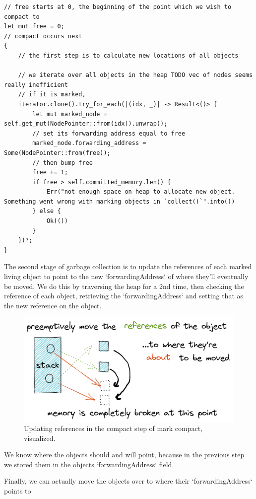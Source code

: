\documentclass[index]{subfiles}
\begin{document}
\begin{verbatim}
// free starts at 0, the beginning of the point which we wish to compact to
let mut free = 0;
// compact occurs next
{
    // the first step is to calculate new locations of all objects

    // we iterate over all objects in the heap TODO vec of nodes seems really inefficient
    // if it is marked,
    iterator.clone().try_for_each(|(idx, _)| -> Result<()> {
        let mut marked_node = self.get_mut(NodePointer::from(idx)).unwrap();
        // set its forwarding address equal to free
        marked_node.forwarding_address = Some(NodePointer::from(free));
        // then bump free
        free += 1;
        if free > self.committed_memory.len() {
            Err("not enough space on heap to allocate new object. Something went wrong with marking objects in `collect()`".into())
        } else {
            Ok(())
        }
    })?;
}
\end{verbatim}

The second stage of garbage collection is to update the references of each marked living object to point to the new `forwardingAddress` of where they'll eventually be moved. We do this by traversing the heap for a 2nd time, then checking the reference of each object, retrieving the `forwardingAddress` and setting that as the new reference on the object.

\begin{figure}[H]
    \centering
    \includegraphics[scale=0.3]{pics/update-references.png}
    \caption{Updating references in the compact step of mark compact, visualized.}
\end{figure}

We know where the objects should and will point, because in the previous step we stored them in the objects `forwardingAddress` field.

Finally, we can actually move the objects over to where their `forwardingAddress` points to
\end{document}
